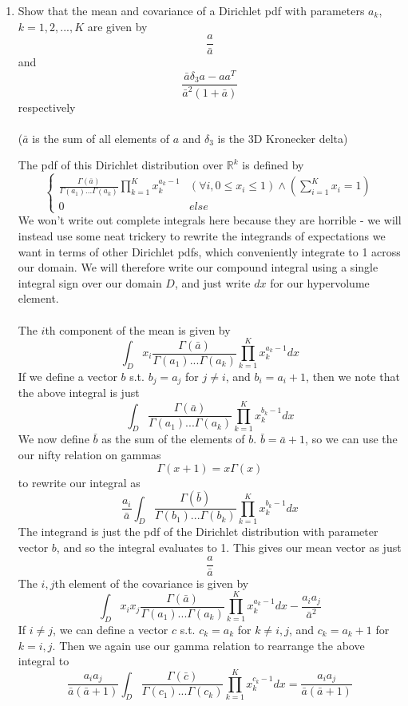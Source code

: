 \documentclass{article}
\newcommand{\chapternumber}{2}
\newenvironment{QandA}{\begin{enumerate}[label=\chapternumber.\arabic*]\bfseries\boldmath}
	{\end{enumerate}}
\newenvironment{answered}{\par\bigskip\normalfont\unboldmath}{}
\begin{document}
\begin{QandA}
	\item Show that the mean and covariance of a Dirichlet pdf with parameters $a_k$, $k=1,2,...,K$ are given by
	\[\frac{a}{\bar{a}}\]
	and
	\[\frac{\bar{a}\delta_3a-aa^T}{\bar{a}^2(1+\bar{a})}\]
	respectively\\
	\\
	($\bar{a}$ is the sum of all elements of $a$ and $\delta_3$ is the 3D Kronecker delta)
	\begin{answered}
		The pdf of this Dirichlet distribution over $\mathbb{R}^k$ is defined by
		\[\begin{cases}
		\frac{\Gamma(\bar{a})}{\Gamma(a_1)...\Gamma(a_k)}\prod_{k=1}^Kx_k^{a_k-1} & (\forall i,0\leq x_i\leq 1)\land(\sum_{i=1}^{K}x_i=1)\\
		0 & else
		\end{cases}\]
		We won't write out complete integrals here because they are horrible - we will instead use some neat trickery to rewrite the integrands of expectations we want in terms of other Dirichlet pdfs, which conveniently integrate to 1 across our domain. We will therefore write our compound integral using a single integral sign over our domain $D$, and just write $dx$ for our hypervolume element.\\
		\\
		The $i$th component of the mean is given by
		\[\int_Dx_i\frac{\Gamma(\bar{a})}{\Gamma(a_1)...\Gamma(a_k)}\prod_{k=1}^Kx_k^{a_k-1}dx\]
		If we define a vector $b$ s.t. $b_j=a_j$ for $j\neq i$, and $b_i=a_i+1$, then we note that the above integral is just
		\[\int_D\frac{\Gamma(\bar{a})}{\Gamma(a_1)...\Gamma(a_k)}\prod_{k=1}^Kx_k^{b_k-1}dx\]
		We now define $\bar{b}$ as the sum of the elements of $b$.
		$\bar{b}=\bar{a}+1$, so we can use the our nifty relation on gammas \[\Gamma(x+1)=x\Gamma(x)\]
		to rewrite our integral as
		\[\frac{a_i}{\bar{a}}\int_D\frac{\Gamma(\bar{b})}{\Gamma(b_1)...\Gamma(b_k)}\prod_{k=1}^Kx_k^{b_k-1}dx\]
		The integrand is just the pdf of the Dirichlet distribution with parameter vector $b$, and so the integral evaluates to 1. This gives our mean vector as just
		\[\frac{a}{\bar{a}}\]
		The $i,j$th element of the covariance is given by
			\[\int_Dx_ix_j\frac{\Gamma(\bar{a})}{\Gamma(a_1)...\Gamma(a_k)}\prod_{k=1}^Kx_k^{a_k-1}dx-\frac{a_ia_j}{\bar{a}^2}\]
		If $i\neq j$, we can define a vector $c$ s.t. $c_k=a_k$ for $k\neq i,j$, and $c_k=a_k+1$ for $k=i,j$. Then we again use our gamma relation to rearrange the above integral to \[\frac{a_ia_j}{\bar{a}(\bar{a}+1)}\int_D\frac{\Gamma(\bar{c})}{\Gamma(c_1)...\Gamma(c_k)}\prod_{k=1}^Kx_k^{c_k-1}dx=\frac{a_ia_j}{\bar{a}(\bar{a}+1)}\]

\end{answered}
\end{QandA}
\end{document}
